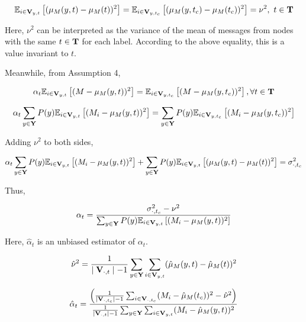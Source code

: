 \begin{align}
\mathbb{E}_{i\in \bold{V}_{y,t}}\left[(\mu_M(y,t)-\mu_M(t))^2 \right]=\mathbb{E}_{i\in \bold{V}_{y,t_{c}}}\left[(\mu_M(y,t_{c})-\mu_M(t_{c}))^2\right] =\nu^2,\ t\in \bold{T}
\end{align}

Here, $\nu^2$ can be interpreted as the variance of the mean of messages from nodes with the same $t\in \bold{T}$ for each label. According to the above equality, this is a value invariant to $t$.

Meanwhile, from Assumption 4,

\begin{align}
\alpha_t \mathbb{E}_{i\in \bold{V}_{y,t}}\left[ (M - \mu_M(y,t))^2 \right] = \mathbb{E}_{i\in \bold{V}_{y,t_{c}}}\left[ (M - \mu_M(y,t_{c}))^2\right], \forall t\in \bold{T}
\end{align}

\begin{align}
\alpha_t\sum_{y\in\bold{Y}}P(y)\mathbb{E}_{i\in \bold{V}_{y,t}}\left[ (M_i - \mu_M(y,t))^2 \right]=\sum_{y\in\bold{Y}}P(y)\mathbb{E}_{i\in \bold{V}_{y,t_{c}}}\left[ (M_i - \mu_M(y,t_{c}))^2\right]
\end{align}

Adding $\nu^2$ to both sides,

\begin{align}
\alpha_t\sum_{y\in \bold{Y}}P(y)\mathbb{E}_{i\in \bold{V}_{y,t}}\left[ (M_i - \mu_M(y,t))^2 \right] +\sum_{y\in \bold{Y}}P(y)\mathbb{E}_{i\in \bold{V}_{y,t}}\left[(\mu_M(y,t)-\mu_M(t))^2 \right] =\sigma_{\cdot,t_{c}}^2 
\end{align}

Thus,

\begin{align}
\alpha_t = { \sigma_{\cdot,t_{c}}^2  - \nu^2\over\sum_{y\in \bold{Y}}P(y)\mathbb{E}_{i\in \bold{V}_{y,t}}\left[ (M_i- \mu_M(y,t))^2 \right]}
\end{align}

Here, $\hat{\alpha}_t$ is an unbiased estimator of $\alpha_t$.

\begin{align}
\hat{\nu}^2={1\over \mid{\bold{V}_{\cdot,t}}\mid-1} \sum_{y\in \bold{Y}}\sum_{i \in \bold{V}_{y,t}}(\hat\mu_M(y,t) -\hat\mu_M(t) )^2  
\end{align}


\begin{align}
\hat{\alpha}_t = {\left( {1\over \mid{\bold{V}_{\cdot,t_{c}}}\mid-1}\sum_{i\in \bold{V}_{\cdot,t_{c}}}(M_i-\hat\mu_M(t_{c}))^2  -\hat{\nu}^2 \right)\over{1\over \mid{\bold{V}_{\cdot,t}}\mid-1} \sum_{y\in\bold{Y}} \sum_{i \in \bold{V}_{y,t}}(M_i-\hat\mu_M(y,t))^2}
\end{align}

